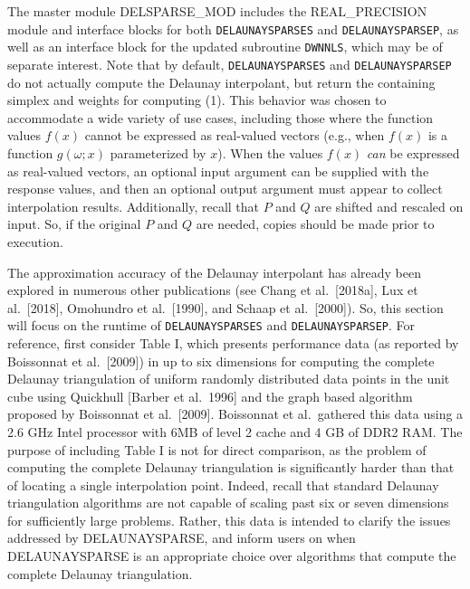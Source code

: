 {The master module DELSPARSE\_MOD includes the REAL\_PRECISION module
and interface blocks for both {\tt DELAUNAYSPARSES} and
{\tt DELAUNAYSPARSEP}, as well as an interface block for the updated
subroutine {\tt DWNNLS}, which may be of separate interest. Note that by
default, {\tt DELAUNAYSPARSES} and {\tt DELAUNAYSPARSEP} do not actually
compute the Delaunay interpolant, but return the containing simplex and
weights for computing (1). This behavior was chosen to accommodate a wide
variety of use cases, including those where the function values $f(x)$
cannot be expressed as real-valued vectors (e.g., when $f(x)$ is a function
$g(\omega;x)$ parameterized by $x$). When the
values $f(x)$ {\it can} be expressed as real-valued vectors, an optional
input argument can be supplied with the response values, and then an
optional output argument must appear to collect interpolation results.
Additionally, recall that $P$ and $Q$ are shifted and rescaled on input.
So, if the original $P$ and $Q$ are needed, copies should
be made prior to execution.


The approximation accuracy of the Delaunay interpolant has already been
explored in numerous other publications (see Chang et al.\ [2018a],
Lux et al.\ [2018], Omohundro et al.\ [1990], and Schaap et al.\ [2000]).
So, this section will focus on the runtime of {\tt DELAUNAYSPARSES} and
{\tt DELAUNAYSPARSEP}. For reference, first consider Table I, which presents
performance data (as reported by Boissonnat et al.\ [2009]) in up to
six dimensions for computing the complete Delaunay triangulation of uniform
randomly distributed data points in the unit cube using
Quickhull [Barber et al.\ 1996] and the graph based algorithm proposed
by Boissonnat et al.\ [2009]. Boissonnat et al.\ gathered this data
using a 2.6 GHz Intel processor with 6MB of level 2 cache and 4 GB of
DDR2 RAM. The purpose of including Table I is not for direct comparison,
as the problem of computing the complete Delaunay triangulation
is significantly harder than that of locating a single interpolation
point. Indeed, recall that standard Delaunay triangulation algorithms
are not capable of scaling past six or seven dimensions for sufficiently
large problems. Rather, this data is intended to clarify the issues addressed
by DELAUNAYSPARSE, and inform users on when DELAUNAYSPARSE is an appropriate
choice over algorithms that compute the complete Delaunay triangulation.

}
